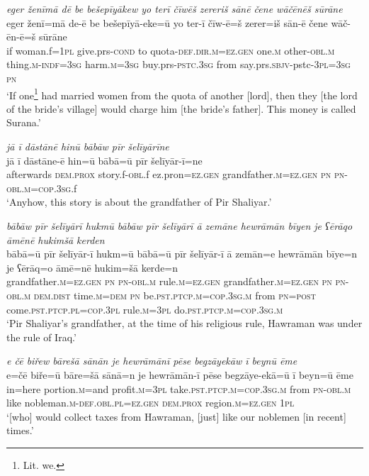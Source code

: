 \ea \label{BP.18}
\textit{eger ženīmā dē be bešepīyākew yo terī čīwēš zereriš sānē čene wāčēnēš sūrāne} \\ 
\gll eger ženī=mā de-ē be bešepīyā-eke=ū yo ter-ī čīw-ē=š zerer=iš sān-ē čene wāč-ēn-ē=š sūrāne \\ 
 if woman.f\textsc{=\textsc{1pl}} give.prs\textsc{-cond} to quota\textsc{-def}\textsc{.dir}\textsc{.m}\textsc{=ez.gen} one\textsc{.m} other\textsc{-obl}\textsc{.m} thing\textsc{.m}\textsc{-indf}\textsc{=3sg} harm\textsc{.m}\textsc{=3sg} buy.prs\textsc{-pstc}\textsc{.3sg} from say.prs.\textsc{sbjv-}pstc\textsc{-3pl}\textsc{=3sg} \textsc{pn} \\ 
\glt `If one\footnote{Lit. we.} had married women from the quota of another [lord], then they [the lord of the bride's village] would charge him [the bride’s father]. This money is called Surana.'
\z 
 
\ea \label{BP.20}
\textit{jā ī dāstānē hinū bābāw pīr šelīyārīne} \\ 
\gll jā ī dāstāne-ē hin=ū bābā=ū pīr šelīyār-ī=ne \\ 
 afterwards \textsc{dem.prox} story.f\textsc{-obl}.f ez.pron\textsc{=ez.gen} grandfather\textsc{.m}\textsc{=ez.gen} \textsc{pn} \textsc{pn}\textsc{-obl}\textsc{.m}\textsc{=cop}\textsc{.3sg}.f \\ 
\glt `Anyhow, this story is about the grandfather of Pir Shaliyar.'
\z 
 
\ea \label{BP.21}
\textit{bābāw pīr šelīyārī hukmū bābāw pīr šelīyārī ā zemāne hewrāmān bīyen je ʕērāqo āmēnē hukimšā kerden} \\ 
\gll bābā=ū pīr šelīyār-ī hukm=ū bābā=ū pīr šelīyār-ī ā zemān=e hewrāmān bīye=n je ʕērāq=o āmē=nē hukim=šā kerde=n \\ 
 grandfather\textsc{.m}\textsc{=ez.gen} \textsc{pn} \textsc{pn}\textsc{-obl}\textsc{.m} rule\textsc{.m}\textsc{=ez.gen} grandfather\textsc{.m}\textsc{=ez.gen} \textsc{pn} \textsc{pn}\textsc{-obl}\textsc{.m} \textsc{dem.dist} time\textsc{.m}\textsc{=dem} \textsc{pn} be\textsc{.pst}\textsc{.ptcp}\textsc{.m}\textsc{=cop}\textsc{.3sg}\textsc{.m} from \textsc{pn}\textsc{=\textsc{post}} come\textsc{.pst}\textsc{.ptcp}\textsc{.pl}\textsc{=cop}\textsc{.3pl} rule\textsc{.m}\textsc{=3pl} do\textsc{.pst}\textsc{.ptcp}\textsc{.m}\textsc{=cop}\textsc{.3sg}\textsc{.m} \\ 
\glt `Pir Shaliyar’s grandfather, at the time of his religious rule, Hawraman was under the rule of Iraq.'
\z 
 
\ea \label{BP.24}
\textit{e čē biřew bārešā sānān je hewrāmānī pēse begzāyekāw ī beynū ēme} \\ 
\gll e=čē biře=ū bāre=šā sānā=n je hewrāmān-ī pēse begzāye-ekā=ū ī beyn=ū ēme \\ 
 in=here portion\textsc{.m}=and profit\textsc{.m}\textsc{=3pl} take\textsc{.pst}\textsc{.ptcp}\textsc{.m}\textsc{=cop}\textsc{.3sg}\textsc{.m} from \textsc{pn}\textsc{-obl}\textsc{.m} like nobleman\textsc{.m}\textsc{-def}\textsc{.obl}\textsc{.pl}\textsc{=ez.gen} \textsc{dem.prox} region\textsc{.m}\textsc{=ez.gen} \textsc{1pl} \\ 
\glt `[who] would collect taxes from Hawraman, [just] like our noblemen [in recent] times.'
\z 
 
